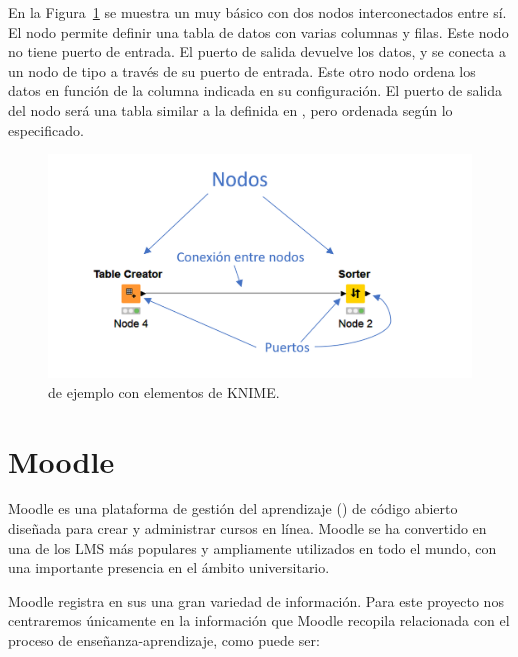 En la Figura~\ref{fig:knime_elementos1} se muestra un  muy básico con dos nodos interconectados entre sí. El nodo 
 permite definir una tabla de datos con varias columnas y filas. Este nodo no tiene puerto de entrada. El puerto de salida 
devuelve los datos, y se conecta a un nodo de tipo  a través de su puerto de entrada. Este otro nodo ordena los datos 
en función de la columna indicada en su configuración. El puerto de salida del nodo  será 
una tabla similar a la definida en , pero ordenada según lo especificado. 

\begin{figure}[!h]
	\centering
	\includegraphics[width=1\textwidth]{img/knime_elementos1.png}
	\caption{ de ejemplo con elementos de KNIME.}
	\label{fig:knime_elementos1}
\end{figure}
\FloatBarrier






\section{Moodle}

Moodle es una plataforma de gestión del aprendizaje () de código abierto diseñada
 para crear y administrar cursos en línea. Moodle se ha convertido en una de los LMS más populares y ampliamente 
 utilizados en todo el mundo, con una importante presencia en el ámbito universitario.
\

Moodle registra en sus  una gran variedad de información. Para este proyecto nos centraremos únicamente en 
la información que Moodle recopila relacionada con el proceso de enseñanza-aprendizaje, como puede ser: 

